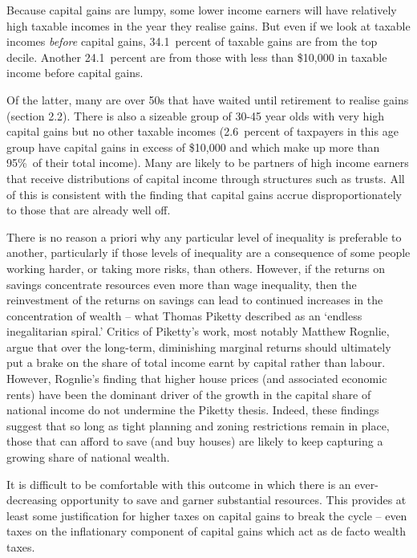 \documentclass{grattan}\usepackage[]{graphicx}\usepackage[]{color}
\begin{document}
Because capital gains are lumpy, some lower income earners will have relatively high taxable incomes in the year they realise gains. But even if we look at taxable incomes \emph{before} capital gains, 34.1~percent of taxable gains are from the top decile. Another 24.1~percent are from those with less than \$10,000 in taxable income before capital gains.

Of the latter, many are over 50s that have waited until retirement to realise gains (section 2.2). There is also a sizeable group of 30-45 year olds with very high capital gains but no other taxable incomes (2.6~percent of taxpayers in this age group have capital gains in excess of \$10,000 and which make up more than 95\%\ of their total income). Many are likely to be partners of high income earners that receive distributions of capital income through structures such as trusts. All of this is consistent with the finding that capital gains accrue disproportionately to those that are already well off. 

There is no reason a priori why any particular level of inequality is preferable to another, particularly if those levels of inequality are a consequence of some people working harder, or taking more risks, than others.  
However, if the returns on savings concentrate resources even more than wage inequality, then the reinvestment of the returns on savings can lead to continued increases in the concentration of wealth -- what Thomas Piketty described as an `endless inegalitarian spiral.'  Critics of Piketty's work, most notably Matthew Rognlie, argue that over the long-term, diminishing marginal returns should ultimately put a brake on the share of total income earnt by capital rather than labour.  However, Rognlie's finding that higher house prices (and associated economic rents) have been the dominant driver of the growth in the capital share of national income  do not undermine the Piketty thesis. Indeed, these findings suggest that so long as tight planning and zoning restrictions remain in place, those that can afford to save (and buy houses) are likely to keep capturing a growing share of national wealth.  

It is difficult to be comfortable with this outcome in which there is an ever-decreasing opportunity to save and garner substantial resources. This provides at least some justification for higher taxes on capital gains to break the cycle -- even taxes on the inflationary component of capital gains which act as de facto wealth taxes.  
\end{document}
